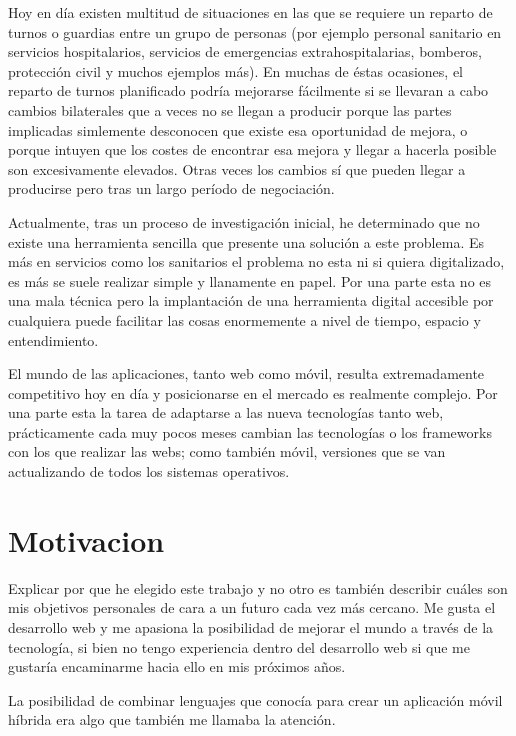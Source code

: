 

Hoy en día existen multitud de situaciones en las que se requiere un reparto de turnos o guardias entre un grupo de personas (por ejemplo personal sanitario en servicios hospitalarios, servicios de emergencias extrahospitalarias, bomberos, protección civil y muchos ejemplos más). En muchas de éstas ocasiones, el reparto de turnos planificado podría mejorarse fácilmente si se llevaran a cabo cambios bilaterales que a veces no se llegan a producir porque las partes implicadas simlemente desconocen que existe esa oportunidad de mejora, o porque intuyen que los costes de encontrar esa mejora y llegar a  hacerla posible son excesivamente elevados. Otras veces los cambios sí que pueden llegar a producirse pero tras un largo período de negociación.

Actualmente, tras un proceso de investigación inicial, he determinado que no existe una herramienta sencilla que presente una solución a este problema. Es más en servicios como los sanitarios el problema no esta ni si quiera digitalizado, es más se suele realizar simple y llanamente en papel. Por una parte esta no es una mala técnica pero la implantación de una herramienta digital accesible por cualquiera puede facilitar las cosas enormemente a nivel de tiempo, espacio y entendimiento. 

El mundo de las aplicaciones, tanto web como móvil, resulta extremadamente competitivo hoy en día y posicionarse en el mercado es realmente complejo. Por una parte esta la tarea de adaptarse a las nueva tecnologías tanto web, prácticamente cada muy pocos meses cambian las tecnologías o los frameworks con los que realizar las webs; como también móvil, versiones que se van actualizando de todos los sistemas operativos. 

\section{Motivacion}\label{Motivacion}

Explicar por que he elegido este trabajo y no otro es también describir cuáles son mis objetivos personales de cara a un futuro cada vez más cercano.  Me gusta el desarrollo web y me apasiona la posibilidad de mejorar el mundo a través de la tecnología, si bien no tengo experiencia dentro del desarrollo web si que me gustaría encaminarme hacia ello en mis próximos años.  

La posibilidad de combinar lenguajes que conocía para crear un aplicación  móvil híbrida era algo que también me llamaba la atención.


